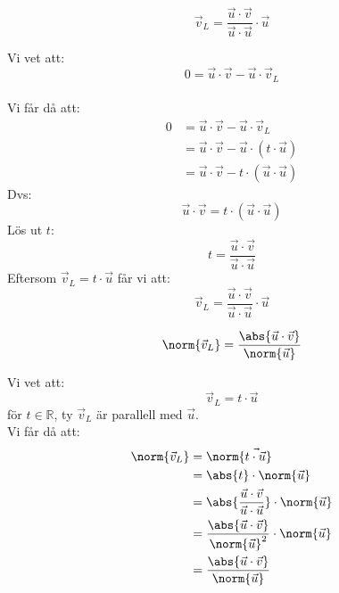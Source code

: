 \begin{sats}
    \begin{equation}
      \vec{v}_L = \frac{\vec{u} \cdot \vec{v}}{\vec{u} \cdot \vec{u}} \cdot \vec{u}
    \end{equation}
\end{sats}
\begin{bevis}
    Vi vet att:
    \[
    0 = \vec{u} \cdot \vec{v} - \vec{u} \cdot \vec{v}_L
    \]\\
    Vi får då att:
    \begin{align*}
    0 &= \vec{u} \cdot \vec{v} - \vec{u} \cdot \vec{v}_L \\
    &= \vec{u} \cdot \vec{v} -  \vec{u} \cdot (t \cdot \vec{u}) \\
    &= \vec{u} \cdot \vec{v} - t \cdot (\vec{u} \cdot \vec{u})
    \end{align*}
    Dvs: 
    \[
        \vec{u} \cdot \vec{v} = t \cdot (\vec{u} \cdot \vec{u})
    \]
    Lös ut $t$:
    \[
        t = \frac{\vec{u} \cdot \vec{v}}{\vec{u} \cdot \vec{u}}
    \]
    Eftersom $\vec{v}_L = t \cdot \vec{u}$ får vi att:
    \[
        \vec{v}_L = \frac{\vec{u} \cdot \vec{v}}{\vec{u} \cdot \vec{u}} \cdot \vec{u}
    \]

\end{bevis}
\begin{sats}
  \begin{equation}
    \norm{\vec{v}_L} = \frac{\abs{\vec{u}\cdot \vec{v}}}{\norm{\vec{u}}}
  \end{equation}
\end{sats}
\begin{bevis}
    Vi vet att:
    \[
        \vec{v}_L = t \cdot \vec{u}
    \]
    för $t \in \mathbb{R}$, ty $\vec{v}_L$ är parallell med $\vec{u}$.\\
    Vi får då att:
    \begin{align*}
    \norm{\vec{v}_L} &= \norm{\vec{t \cdot \vec{u}}} \\
    &= \abs{t} \cdot \norm{\vec{u}} \\
    &= \abs{\frac{\vec{u} \cdot \vec{v}}{\vec{u} \cdot \vec{u}}} \cdot \norm{\vec{u}} \\
    &= \frac{\abs{\vec{u} \cdot \vec{v}}}{\norm{\vec{u}}^2} \cdot \norm{\vec{u}} \\
    &= \frac{\abs{\vec{u} \cdot \vec{v}}}{\norm{\vec{u}}}
    \end{align*}
    
\end{bevis}

